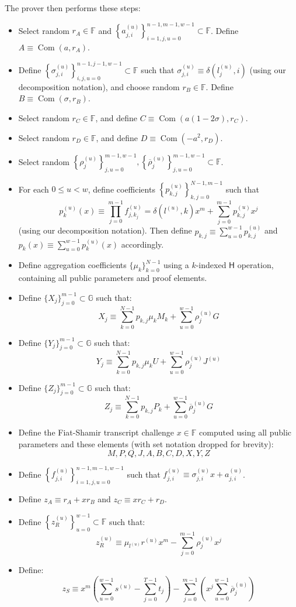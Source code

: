 \documentclass[draft]{article} %
\newcommand{\G}{\mathbb{G}}
\newcommand{\F}{\mathbb{F}}
\newcommand{\hs}{\mathsf{H}}
\newcommand{\com}{\operatorname{Com}}
\newcommand{\sumj}{\sum_{j=0}^{m-1}}
\newcommand{\sumk}{\sum_{k=0}^{N-1}}
\newcommand{\sumu}{\sum_{u=0}^{w-1}}
\begin{document}
The prover then performs these steps:
\begin{itemize}
\item Select random $r_A \in \F$ and $\left\{a^{(u)}_{j,i}\right\}_{i=1,j,u=0}^{n-1,m-1,w-1} \subset \F$.
Define $A \equiv \com(a,r_A)$.
\item Define $\left\{\sigma^{(u)}_{j,i}\right\}_{i,j,u=0}^{n-1,j-1,w-1} \subset \F$ such that $\sigma^{(u)}_{j,i} \equiv \delta\left(l^{(u)}_j,i\right)$ (using our decomposition notation), and choose random $r_B \in \F$.
Define $B \equiv \com(\sigma,r_B)$.
\item Select random $r_C \in \F$, and define $C \equiv \com(a(1-2\sigma), r_C)$.
\item Select random $r_D \in \F$, and define $D \equiv \com(-a^2, r_D)$.
\item Select random $\left\{\rho^{(u)}_j\right\}_{j,u=0}^{m-1,w-1}, \left\{\overline{\rho}^{(u)}_j\right\}_{j,u=0}^{m-1,w-1} \subset \F$.
\item For each $0 \leq u < w$, define coefficients $\left\{p^{(u)}_{k,j}\right\}_{k,j=0}^{N-1,m-1}$ such that $$p^{(u)}_k(x) \equiv \prod_{j=0}^{m-1} f^{(u)}_{j,k_j} = \delta\left(l^{(u)},k\right)x^m + \sumj p^{(u)}_{k,j}x^j$$ (using our decomposition notation).
Then define $p_{k,j} \equiv \sumu p^{(u)}_{k,j}$ and $p_k(x) \equiv \sumu p^{(u)}_k(x)$ accordingly.
\item Define aggregation coefficients $\{\mu_k\}_{k=0}^{N-1}$ using a $k$-indexed $\hs$ operation, containing all public parameters and proof elements.
\item Define $\{X_j\}_{j=0}^{m-1} \subset \G$ such that: $$X_j \equiv \sumk p_{k,j}\mu_kM_k + \sumu \rho^{(u)}_jG$$
\item Define $\{Y_j\}_{j=0}^{m-1} \subset \G$ such that: $$Y_j \equiv \sumk p_{k,j}\mu_kU + \sumu \rho^{(u)}_jJ^{(u)}$$
\item Define $\{Z_j\}_{j=0}^{m-1} \subset \G$ such that: $$Z_j \equiv \sumk p_{k,j}P_k + \sumu \overline{\rho}^{(u)}_jG$$
\item Define the Fiat-Shamir transcript challenge $x \in \F$ computed using all public parameters and these elements (with set notation dropped for brevity): $$M,P,Q,J,A,B,C,D,X,Y,Z$$
\item Define $\left\{f^{(u)}_{j,i}\right\}_{i=1,j,u=0}^{n-1,m-1,w-1}$ such that $f^{(u)}_{j,i} \equiv \sigma^{(u)}_{j,i}x + a^{(u)}_{j,i}$.
\item Define $z_A \equiv r_A + xr_B$ and $z_C \equiv xr_C + r_D$.
\item Define $\left\{z^{(u)}_R\right\}_{u=0}^{w-1} \subset \F$ such that: $$z^{(u)}_R \equiv \mu_{l^{(u)}}r^{(u)}x^m - \sumj \rho^{(u)}_jx^j$$
\item Define: $$z_S \equiv x^m\left( \sumu s^{(u)} - \sum_{j=0}^{T-1} t_j \right) - \sumj \left(x^j \sumu \overline{\rho}^{(u)}_j\right)$$
\end{itemize}
\end{document}
